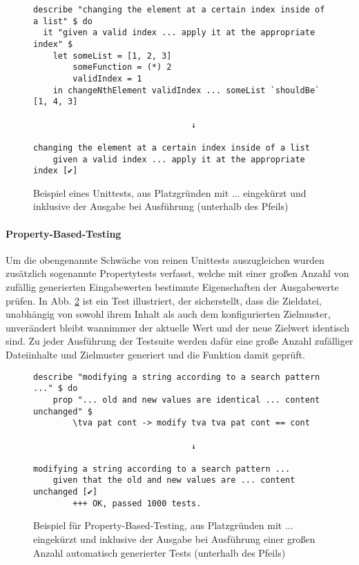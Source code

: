 \begin{figure}
    \caption{Beispiel eines Unittests, aus Platzgründen mit ... eingekürzt und inklusive
        der Ausgabe bei Ausführung (unterhalb des Pfeils)}
    \label{unit-test}
    \begin{verbatim}
describe "changing the element at a certain index inside of a list" $ do
  it "given a valid index ... apply it at the appropriate index" $
    let someList = [1, 2, 3]
        someFunction = (*) 2
        validIndex = 1
    in changeNthElement validIndex ... someList `shouldBe` [1, 4, 3]

                                ↓

changing the element at a certain index inside of a list
    given a valid index ... apply it at the appropriate index [✔]
    \end{verbatim}
\end{figure}

\paragraph{\gls{Property-Based-Testing}}
Um die obengenannte Schwäche von reinen Unittests auszugleichen wurden zusätzlich
sogenannte Propertytests verfasst, welche mit einer großen Anzahl von zufällig generierten
Eingabewerten bestimmte Eigenschaften der Ausgabewerte prüfen. In Abb. \ref{property-test}
ist ein Test illustriert, der sicherstellt, dass die Zieldatei, unabhängig von
sowohl ihrem Inhalt als auch dem konfigurierten \gls{Zielmuster}, unverändert
bleibt wannimmer der aktuelle Wert und der neue Zielwert identisch sind. Zu
jeder Ausführung der Testsuite werden dafür eine große Anzahl zufälliger Dateiinhalte
und Zielmuster generiert und die Funktion damit geprüft.

\begin{figure}
    \caption{Beispiel für \gls{Property-Based-Testing}, aus Platzgründen mit ... eingekürzt und inklusive
        der Ausgabe bei Ausführung einer großen Anzahl automatisch generierter Tests (unterhalb des Pfeils)}
    \label{property-test}
    \begin{verbatim}
describe "modifying a string according to a search pattern ..." $ do
    prop "... old and new values are identical ... content unchanged" $
        \tva pat cont -> modify tva tva pat cont == cont

                                ↓

modifying a string according to a search pattern ...
    given that the old and new values are ... content unchanged [✔]
        +++ OK, passed 1000 tests.
    \end{verbatim}
\end{figure}


